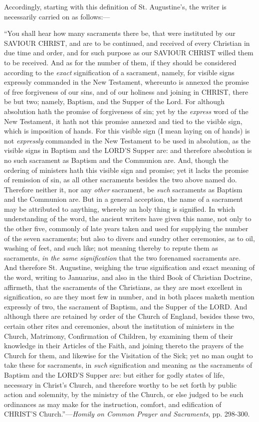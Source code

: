 Accordingly, starting with this definition of St. Augustine's, the
writer is necessarily carried on as follows:—

``You shall hear how many sacraments there be,
that were instituted by our SAVIOUR
CHRIST, and are to be
continued, and received of every Christian in due time and order, and
for such purpose as our SAVIOUR
CHRIST willed them to be
received. And as for the number of them, if they should be considered
according to the \emph{exact} signification of a sacrament, namely,
for visible signs expressly commanded in the New Testament, whereunto
is annexed the promise of free forgiveness of our sins, and of our
holiness and joining in CHRIST,
there be but two; namely, Baptism, and the Supper of the Lord. For
although absolution hath the promise of forgiveness of sin; yet by the
\emph{express} word of the New Testament, it hath not this promise
annexed and tied to the visible sign, which is imposition of hands.
For this visible sign (I mean laying on of hands) is not \emph{expressly}
commanded in the New Testament to be used in absolution, as the
visible signs in Baptism and the LORD'S
Supper are: and therefore absolution is no such sacrament as Baptism
and the Communion are. And, though the ordering of ministers hath this
visible sign and promise; yet it lacks the promise of remission of
sin, as all other sacraments besides the two above named do. Therefore
neither it, nor any \emph{other} sacrament, be \emph{such} sacraments
as Baptism and the Communion are. But in a general acception, the name
of a sacrament may be attributed to anything, whereby an holy thing is
signified. In which understanding of the word, the ancient writers
have given this name, not only to the other five, commonly of late
years taken and used for supplying the number of the seven sacraments;
but also to divers and sundry other ceremonies, as to oil, washing of
feet, and such like; not meaning thereby to repute them as sacraments,
\emph{in the same signification} that the two forenamed sacraments
are. And therefore St. Augustine, weighing the true signification and exact meaning of the word, writing to Januarius, and
also in the third Book of Christian Doctrine, affirmeth, that the
sacraments of the Christians, as they are most excellent in
signification, so are they most few in number, and in both places
maketh mention expressly of two, the sacrament of Baptism, and the
Supper of the LORD. And
although there are retained by order of the Church of England, besides
these two, certain other rites and ceremonies, about the institution
of ministers in the Church, Matrimony, Confirmation of Children, by
examining them of their knowledge in their Articles of the Faith, and
joining thereto the prayers of the Church for them, and likewise for
the Visitation of the Sick; yet no man ought to take these for
sacraments, in \emph{such} signification and meaning as the sacraments
of Baptism and the LORD'S
Supper are: but either for godly states of life, necessary in Christ's
Church, and therefore worthy to be set forth by public action and
solemnity, by the ministry of the Church, or else judged to be such
ordinances as may make for the instruction, comfort, and edification
of CHRIST'S Church.''—\emph{Homily
on Common Prayer and Sacraments}, pp. 298-300.

